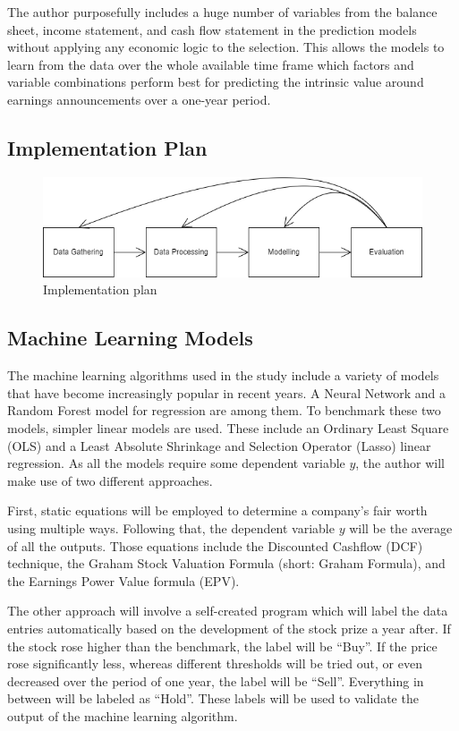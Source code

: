 \documentclass{imc-inf}
\begin{document}
The author purposefully includes a huge number of variables from the balance sheet, income statement, and cash flow statement in the prediction models without applying any economic logic to the selection. This allows the models to learn from the data over the whole available time frame which factors and variable combinations perform best for predicting the intrinsic value around earnings announcements over a one-year period.

\subsection{Implementation Plan}%

\begin{figure}[h]
	\centering
	\includegraphics[width=1.0\textwidth]{resources/pipeline.drawio}
	\caption{Implementation plan}
	\label{fig:pipeline}
\end{figure}


\subsection{Machine Learning Models}%
The machine learning algorithms used in the study include a variety of models that have become increasingly popular in recent years. A Neural Network and a Random Forest model for regression are among them. To benchmark these two models, simpler linear models are used. These include an Ordinary Least Square (OLS) and a Least Absolute Shrinkage and Selection Operator (Lasso) linear regression. As all the models require some dependent variable $y$, the author will make use of two different approaches. 

First, static equations will be employed to determine a company's fair worth using multiple ways. Following that, the dependent variable $y$ will be the average of all the outputs. Those equations include the Discounted Cashflow (DCF) technique, the Graham Stock Valuation Formula (short: Graham Formula), and the Earnings Power Value formula (EPV).

The other approach will involve a self-created program which will label the data entries automatically based on the development of the stock prize a year after. If the stock rose higher than the benchmark, the label will be “Buy”. If the price rose significantly less, whereas different thresholds will be tried out, or even decreased over the period of one year, the label will be “Sell”. Everything in between will be labeled as “Hold”. These labels will be used to validate the output of the machine learning algorithm.
\end{document}
